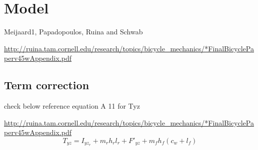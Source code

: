\documentclass[11pt]{article}
\begin{document}
\section{Model}
Meijaard1, Papadopoulos, Ruina and Schwab

\url{http://ruina.tam.cornell.edu/research/topics/bicycle_mechanics/*FinalBicyclePaperv45wAppendix.pdf}

\subsection{Term correction}
check below reference equation A 11 for Tyz

\url{http://ruina.tam.cornell.edu/research/topics/bicycle_mechanics/*FinalBicyclePaperv45wAppendix.pdf}
\begin{equation}
    T_{yz} = I_{yz_r} + m_r h_r l_r + F'_{yz} + m_f h_f (c_w + l_f)
\end{equation}
\end{document}
